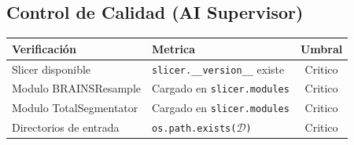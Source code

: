 \documentclass[12pt,a4paper]{article}
\begin{document}
\begin{tcolorbox}[aiSupervisor]
\subsection*{Control de Calidad (AI Supervisor)}

\begin{table}[H]
\centering
\begin{tabular}{llc}
\toprule
\textbf{Verificación} & \textbf{Metrica} & \textbf{Umbral} \\
\midrule
Slicer disponible & \texttt{slicer.\_\_version\_\_} existe & Critico \\
Modulo BRAINSResample & Cargado en \texttt{slicer.modules} & Critico \\
Modulo TotalSegmentator & Cargado en \texttt{slicer.modules} & Critico \\
Directorios de entrada & \texttt{os.path.exists($\mathcal{D}$)} & Critico \\
\bottomrule
\end{tabular}
\end{table}

\newpage


\newpage


\newpage


\newpage


\newpage


\newpage


\newpage


\newpage

\end{tcolorbox}
\end{document}
